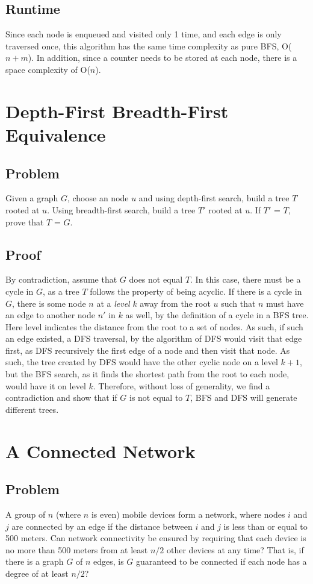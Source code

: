 \documentclass[titlepage]{article}
\numberwithin{equation}{subsection}
\begin{document}
\subsection{Runtime}
Since each node is enqueued and visited only 1 time, and each edge
is only traversed once, this algorithm has the same time complexity as
pure BFS, O($n+m$). In addition, since a counter needs to be stored
at each node, there is a space complexity of O($n$).
\section{Depth-First Breadth-First Equivalence}
\subsection{Problem}
Given a graph $G$, choose an node $u$ and using depth-first search,
build a tree $T$ rooted at $u$. Using breadth-first search, build a
tree $T'$ rooted at $u$. If $T'$ = $T$, prove that $T$ = $G$.
\subsection{Proof}
By contradiction, assume that $G$ does not equal $T$. In this case,
there must be a cycle in $G$, as a tree $T$ follows the property
of being acyclic. If there is a cycle in $G$, there is some node $n$
at a \textit{level} $k$ away from the root $u$ such that $n$ must have
an edge to another node $n'$ in $k$ as well, by the definition of a cycle
in a BFS tree. Here level indicates the distance from the root to a set of
nodes. As such, if such an edge existed, a DFS traversal, by the algorithm
of DFS would visit that edge first, as DFS recursively the first edge
of a node and then visit that node. As such, the tree created by DFS would
have the other cyclic node on a level $k+1$, but the BFS search, as it finds
the shortest path from the root to each node, would have it on level $k$.
Therefore, without loss of generality, we find a contradiction and show that
if $G$ is not equal to $T$, BFS and DFS will generate different trees.
\section{A Connected Network}
\subsection{Problem}
A group of $n$ (where $n$ is even) mobile devices form a network,
where nodes $i$ and $j$ are connected by an edge if the distance between
$i$ and $j$ is less than or equal to 500 meters. Can network connectivity
be ensured by requiring that each device is no more than 500 meters from
at least $n/2$ other devices at any time? That is, if there is a 
graph $G$ of $n$ edges, is $G$ guaranteed to be connected if each
node has a degree of at least $n/2$?
\end{document}
